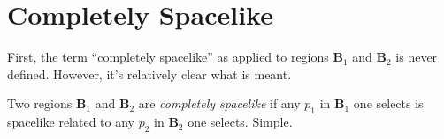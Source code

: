 \section{Completely Spacelike}\label{sctn:completely-spacelike}
First, the term ``completely spacelike'' as applied to regions $\mathbf{B}_1$ and $\mathbf{B}_2$ is never defined. However, it's relatively clear what is meant.

Two regions $\mathbf{B}_1$ and $\mathbf{B}_2$ are \textit{completely spacelike} if any $p_1$ in $\mathbf{B}_1$ one selects is spacelike related to any $p_2$ in $\mathbf{B}_2$ one selects. Simple.

